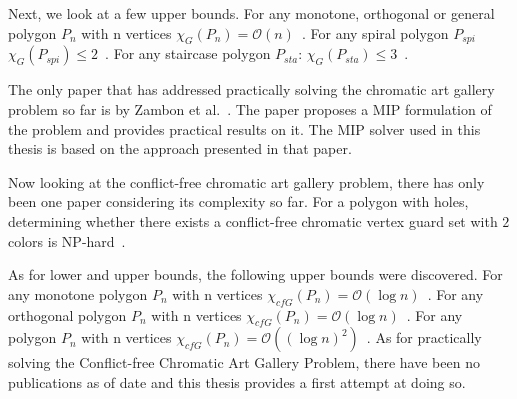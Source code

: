 Next, we look at a few upper bounds.
For any monotone, orthogonal or general polygon $P_n$ with n vertices $\chi_G(P_n) = \mathcal{O}(n)$~\cite{bartschi2011coloring}.
For any spiral polygon $P_{spi}$ $\chi_G(P_{spi}) \leq 2$~\cite{erickson2012art}.
For any staircase polygon $P_{sta}$: $\chi_G(P_{sta}) \leq 3$~\cite{erickson2012art}.

The only paper that has addressed practically solving the chromatic art gallery problem so far is by Zambon et al.~\cite{zambon2014exact}. The paper proposes a MIP formulation of the problem and provides practical results on it. The MIP solver used in this thesis is based on the approach presented in that paper.

Now looking at the conflict-free chromatic art gallery problem, there has only been one paper considering its complexity so far.
For a polygon with holes, determining whether there exists a conflict-free chromatic vertex guard set with $2$ colors is NP-hard~\cite{iwamoto2022vertex}.

As for lower and upper bounds, the following upper bounds were discovered.
For any monotone polygon $P_n$ with n vertices $\chi_{cfG}(P_n) = \mathcal{O}(\log n)$~\cite{bartschi2011coloring}.
For any orthogonal polygon $P_n$ with n vertices $\chi_{cfG}(P_n) = \mathcal{O}(\log n)$~\cite{bartschi2011coloring}.
For any polygon $P_n$ with n vertices $\chi_{cfG}(P_n) = \mathcal{O}((\log n)^2)$~\cite{bartschi2011coloring}.
As for practically solving the Conflict-free Chromatic Art Gallery Problem, there have been no publications as of date and this thesis provides a first attempt at doing so.


